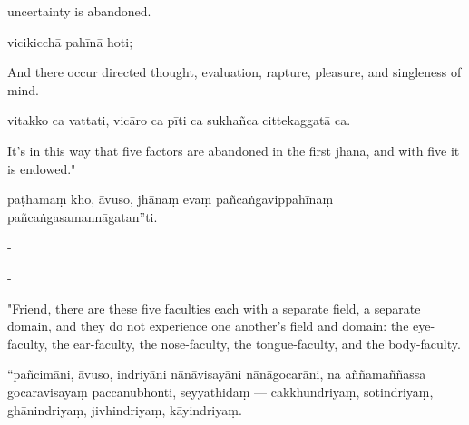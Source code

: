 \begin{samepage}
\begin{leftcolumn*}
uncertainty is abandoned.
\end{leftcolumn*}

\begin{rightcolumn}
vicikicchā pahīnā hoti;
\end{rightcolumn}
\end{samepage}

\begin{samepage}
\begin{leftcolumn*}
And there occur directed thought, evaluation, rapture, pleasure, and singleness of mind.
\end{leftcolumn*}

\begin{rightcolumn}
vitakko ca vattati, vicāro ca pīti ca sukhañca cittekaggatā ca.
\end{rightcolumn}
\end{samepage}

\begin{samepage}
\begin{leftcolumn*}
It's in this way that five factors are abandoned in the first jhana, and with five it is endowed."
\end{leftcolumn*}

\begin{rightcolumn}
paṭhamaṃ kho, āvuso, jhānaṃ evaṃ pañcaṅgavippahīnaṃ pañcaṅgasamannāgatan”ti.
\end{rightcolumn}
\end{samepage}

\begin{samepage}
\begin{leftcolumn*}
-
\end{leftcolumn*}

\begin{rightcolumn}
-
\end{rightcolumn}
\end{samepage}

\begin{samepage}
\begin{leftcolumn*}
"Friend, there are these five faculties each with a separate field, a separate domain, and they do not experience one another's field and domain: the eye-faculty, the ear-faculty, the nose-faculty, the tongue-faculty, and the body-faculty.
\end{leftcolumn*}

\begin{rightcolumn}
“pañcimāni, āvuso, indriyāni nānāvisayāni nānāgocarāni, na aññamaññassa gocaravisayaṃ paccanubhonti, seyyathidaṃ — cakkhundriyaṃ, sotindriyaṃ, ghānindriyaṃ, jivhindriyaṃ, kāyindriyaṃ.
\end{rightcolumn}
\end{samepage}

